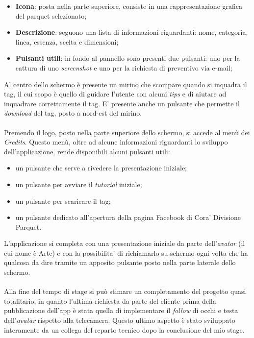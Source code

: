 \begin{itemize}
	\item \textbf{Icona}: posta nella parte superiore, consiste in una rappresentazione grafica del parquet selezionato;
	\item \textbf{Descrizione}: seguono una lista di informazioni riguardanti: nome, categoria, linea, essenza, scelta e dimensioni;
	\item \textbf{Pulsanti utili}: in fondo al pannello sono presenti due pulsanti: uno per la cattura di uno \textit{screenshot} e uno per la richiesta di preventivo via e-mail;
\end{itemize}
\noindent
Al centro dello schermo \`e presente un mirino che scompare quando si inquadra il tag, il cui scopo \`e quello di guidare l'utente con alcuni \textit{tips} e di aiutare ad inquadrare correttamente il tag. E' presente anche un pulsante che permette il \textit{download} del tag, posto a nord-est del mirino.\\\\

Premendo il logo, posto nella parte superiore dello schermo, si accede al men\`u dei \textit{Credits}. Questo men\`u, oltre ad alcune informazioni riguardanti lo sviluppo dell'applicazione, rende disponibili alcuni pulsanti utili:

\begin{itemize}
	\item un pulsante che serve a rivedere la presentazione iniziale;
	\item un pulsante per avviare il \textit{tutorial} iniziale;
	\item un pulsante per scaricare il tag;
	\item un pulsante dedicato all'apertura della pagina Facebook di Cora' Divisione Parquet.
\end{itemize}

L'applicazione si completa con una presentazione iniziale da parte dell'\textit{avatar\gloss} (il cui nome \`e Arte) e con la possibilita' di richiamarlo su schermo ogni volta che ha qualcosa da dire tramite un apposito pulsante posto nella parte laterale dello schermo.\\\\

\noindent
Alla fine del tempo di stage si pu\`o stimare un completamento del progetto quasi totalitario, in quanto l'ultima richiesta da parte del cliente prima della pubblicazione dell'app \`e stata quella di implementare il \textit{follow} di occhi e testa dell'\textit{avatar\gloss} rispetto alla telecamera. Questo ultimo aspetto \`e stato sviluppato interamente da un collega del reparto tecnico dopo la conclusione del mio stage.\\